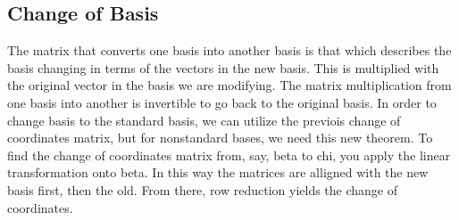 \documentclass[12pt]{article}
\begin{document}
 \subsection{Change of Basis}
 The matrix that converts one basis into another basis is that which describes the basis changing in terms of the vectors in the new basis. 
 This is multiplied with the original vector in the basis we are modifying. The matrix multiplication from one basis into another
 is invertible to go back to the original basis. In order to change basis to the standard basis, we can utilize the previois change of 
 coordinates matrix, but for nonstandard bases, we need this new theorem. To find the change of coordinates matrix from, say, beta to chi, 
 you apply the linear transformation onto beta. In this way the matrices are alligned with the new basis first, then the old. From there, 
 row reduction yields the change of coordinates. 
    
\end{document}

